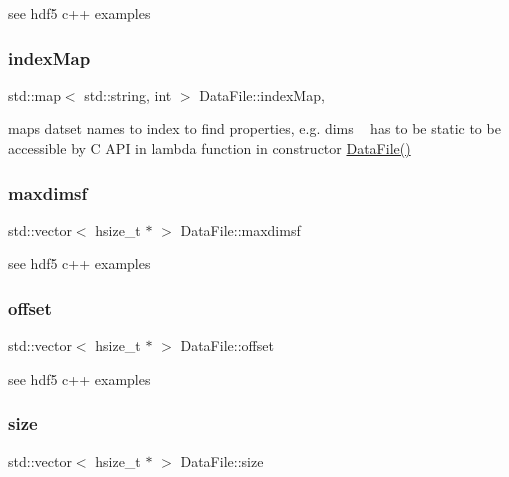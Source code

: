 see hdf5 c++ examples \mbox{\label{classDataFile_ab08fca1e2ac3355f2279faf37054ddfc}} 
\subsubsection{\texorpdfstring{index\+Map}{indexMap}}
{\footnotesize\ttfamily std\+::map$<$ std\+::string, int $>$ Data\+File\+::index\+Map\hspace{0.3cm}{\ttfamily [static]}, {\ttfamily [private]}}

maps datset names to index to find properties, e.\+g. dims ~\newline
 has to be static to be accessible by C A\+PI in lambda function in constructor \hyperlink{classDataFile_a506afaa3e498c06d841cfd2166724add}{Data\+File()} \mbox{\label{classDataFile_a60c9e3ae1cf557b5a396754c203a08c7}} 
\subsubsection{\texorpdfstring{maxdimsf}{maxdimsf}}
{\footnotesize\ttfamily std\+::vector$<$ hsize\+\_\+t $\ast$ $>$ Data\+File\+::maxdimsf\hspace{0.3cm}{\ttfamily [private]}}

see hdf5 c++ examples \mbox{\label{classDataFile_a6574c6c8e7e7a161b1a97f5ab669e2a6}} 
\subsubsection{\texorpdfstring{offset}{offset}}
{\footnotesize\ttfamily std\+::vector$<$ hsize\+\_\+t $\ast$ $>$ Data\+File\+::offset\hspace{0.3cm}{\ttfamily [private]}}

see hdf5 c++ examples \mbox{\label{classDataFile_ace2d4ef0b734ca4f1945b60f3acc9912}} 
\subsubsection{\texorpdfstring{size}{size}}
{\footnotesize\ttfamily std\+::vector$<$ hsize\+\_\+t $\ast$ $>$ Data\+File\+::size\hspace{0.3cm}{\ttfamily [private]}}


